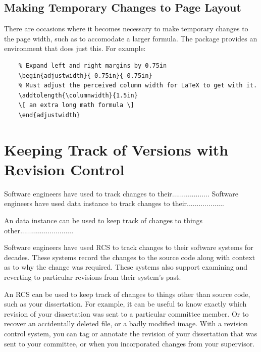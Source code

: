 \subsection{Making Temporary Changes to Page Layout}

There are occasions where it becomes necessary to make temporary
changes to the page width, such as to accomodate a larger formula. 
The  package provides an 
environment that does just this.  For example:
\begin{lstlisting}
    % Expand left and right margins by 0.75in
    \begin{adjustwidth}{-0.75in}{-0.75in}
    % Must adjust the perceived column width for LaTeX to get with it.
    \addtolength{\columnwidth}{1.5in}
    \[ an extra long math formula \]
    \end{adjustwidth}
\end{lstlisting}


\section{Keeping Track of Versions with Revision Control}
Software engineers have used  to track changes to their...................
Software engineers have used \acf{data instance} to track changes to their...................

An \ac{data instance} can be used to keep track of changes to things other...........................

\label{sec:DissertationRevisionControl}

Software engineers have used \acf{RCS} to track changes to their
software systems for decades.  These systems record the changes to
the source code along with context as to why the change was required.
These systems also support examining and reverting to particular
revisions from their system's past.

An \ac{RCS} can be used to keep track of changes to things other
than source code, such as your dissertation.  For example, it can
be useful to know exactly which revision of your dissertation was
sent to a particular committee member.  Or to recover an accidentally
deleted file, or a badly modified image.  With a revision control
system, you can tag or annotate the revision of your dissertation
that was sent to your committee, or when you incorporated changes
from your supervisor.

